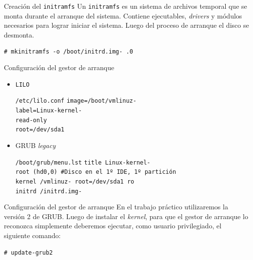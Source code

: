 \begin{frame}{Creación del \texttt{initramfs}}
  Un \texttt{initramfs} es un sistema de archivos temporal que se monta
  durante el arranque del sistema. Contiene ejecutables, \textit{drivers} y
  módulos necesarios para lograr iniciar el sistema. Luego del proceso de
  arranque el disco se desmonta.
  
  \begin{block}{}
    \texttt{\# mkinitramfs -o /boot/initrd.img-\KERNELBASEVERSION\ \KERNELBASEVERSION.0 }
  \end{block}  
\end{frame}

\begin{frame}{Configuración del gestor de arranque}
\begin{itemize}
\item \texttt{LILO}
  \begin{block}{\texttt{/etc/lilo.conf}}
    \texttt{image=/boot/vmlinuz-\KERNELBASEVERSION \\
    label=Linux-kernel-\KERNELBASEVERSION \\
    read-only \\
    root=/dev/sda1}
  \end{block}
\item GRUB \textit{legacy}
  \begin{block}{\texttt{/boot/grub/menu.lst}}
    \texttt{title     Linux-kernel-\KERNELBASEVERSION \\
    root     (hd0,0) \#Disco en el 1º IDE, 1º partición \\
    kernel  /vmlinuz-\KERNELBASEVERSION\ root=/dev/sda1 ro \\
    initrd /initrd.img-\KERNELBASEVERSION}
  \end{block}
\end{itemize}
\end{frame}
\begin{frame}{Configuración del gestor de arranque}
  En el trabajo práctico utilizaremos la versión 2 de GRUB. Luego de
  instalar el \textit{kernel}, para que el gestor de arranque lo reconozca
  simplemente deberemos ejecutar, como usuario privilegiado, el siguiente
  comando:

  \begin{block}{}
    \texttt{\# update-grub2}
  \end{block}
  
\end{frame}

